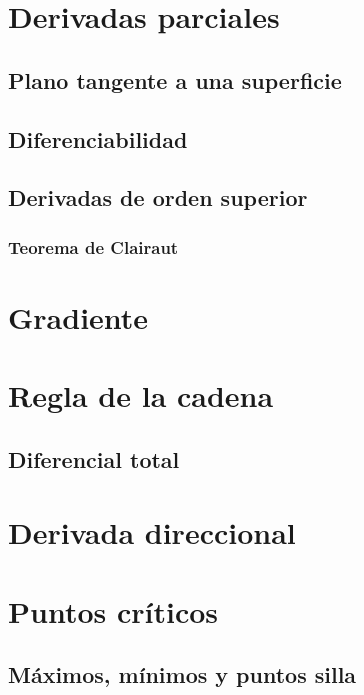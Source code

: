 \documentclass[12pt, fleqn]{report}                             %
\theoremstyle{break}                                            %
\begin{document}
        \section{Derivadas parciales}
        
            \subsection{Plano tangente a una superficie}
            
            \subsection{Diferenciabilidad}
            
            \subsection{Derivadas de orden superior}
            
                \subsubsection{Teorema de Clairaut}
                
        \section{Gradiente}
                
        \section{Regla de la cadena}
        
            \subsection{Diferencial total}
            
        \section{Derivada direccional}
        
        \section{Puntos críticos}
        
            \subsection{Máximos, mínimos y puntos silla}
            
\end{document}
